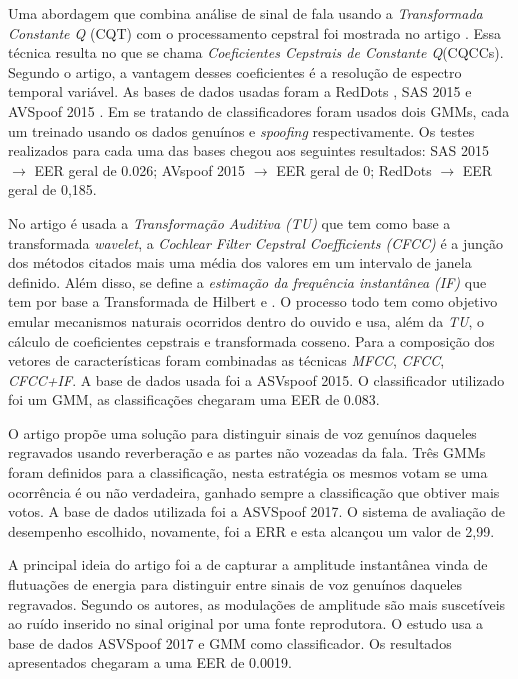 		\par Uma abordagem que combina análise de sinal de fala usando a \textit{Transformada Constante Q} (CQT) com o processamento cepstral foi mostrada no artigo \cite{TODISCO2017516}. Essa técnica resulta no que se chama \textit{Coeficientes Cepstrais de Constante Q}(CQCCs). Segundo o artigo, a vantagem desses coeficientes é a resolução de espectro temporal variável. As bases de dados usadas foram a RedDots \cite{redDots}, SAS 2015 e AVSpoof 2015 \cite{AVSpoof2015}. Em se tratando de classificadores foram usados dois GMMs, cada um treinado usando os dados genuínos e \textit{spoofing} respectivamente. Os testes realizados para cada uma das bases chegou aos seguintes resultados: SAS 2015 $\rightarrow$ EER geral de 0.026; AVspoof 2015 $\rightarrow$ EER geral de 0; RedDots $\rightarrow$ EER geral de 0,185.

		\par No artigo \cite{Patel2015} é usada a \textit{Transformação Auditiva (TU)} que tem como base a transformada \textit{wavelet}, a \textit{Cochlear Filter Cepstral Coefficients (CFCC)} é a junção dos métodos citados mais uma média dos valores em um intervalo de janela definido. Além disso, se define a \textit{estimação da frequência instantânea (IF)} que tem por base a Transformada de Hilbert\cite{johansson1999hilbert} e \cite{kschischang2006hilbert}. O processo todo tem como objetivo emular mecanismos naturais ocorridos dentro do ouvido e usa, além da \textit{TU}, o cálculo de coeficientes cepstrais e transformada cosseno. Para a composição dos vetores de características foram combinadas as técnicas \textit{MFCC}, \textit{CFCC}, \textit{CFCC+IF}. A base de dados usada foi a ASVspoof 2015. O classificador utilizado foi um GMM, as classificações chegaram uma EER de 0.083.

		\par O artigo \cite{ISI:000490497200068} propõe uma solução para distinguir sinais de voz genuínos daqueles regravados usando reverberação e as partes não vozeadas da fala. Três GMMs foram definidos para a classificação, nesta estratégia os mesmos votam se uma ocorrência é ou não verdadeira, ganhado sempre a classificação que obtiver mais votos. A base de dados utilizada foi a ASVSpoof 2017. O sistema de avaliação de desempenho escolhido, novamente, foi a ERR e esta alcançou um valor de 2,99.
		
		\par A principal ideia do artigo \cite{ISI:000465363900136} foi a de capturar a amplitude instantânea vinda de flutuações de energia para distinguir entre sinais de voz genuínos daqueles regravados. Segundo os autores, as modulações de amplitude são mais suscetíveis ao ruído inserido no sinal original por uma fonte reprodutora. O estudo usa a base de dados ASVSpoof 2017 e GMM como classificador. Os resultados apresentados chegaram a uma EER de 0.0019.

